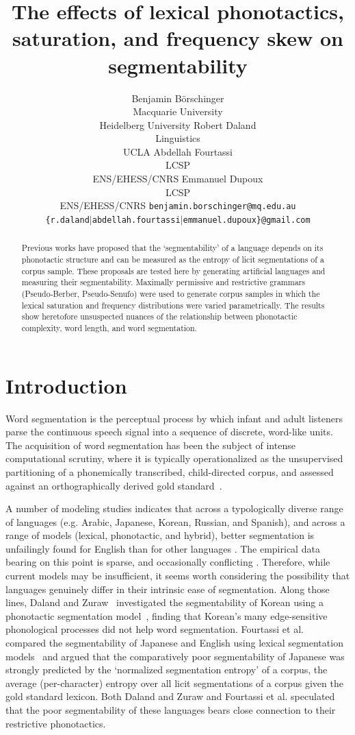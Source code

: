 \documentclass[11pt]{article}
\title{The effects of lexical phonotactics, saturation,
  and frequency skew on segmentability}
\author{Benjamin B{\"o}rschinger \\
    Macquarie University\\
    Heidelberg University \And
    Robert Daland \\
    Linguistics \\
    UCLA \And
    Abdellah Fourtassi \\
    LCSP \\
    ENS/EHESS/CNRS \And
    Emmanuel Dupoux \\
    LCSP \\
    ENS/EHESS/CNRS\AND
    {\tt benjamin.borschinger@mq.edu.au}\\
    {\tt \{r.daland$\mid$abdellah.fourtassi$\mid$emmanuel.dupoux\}@gmail.com}}
\date{}
\begin{document}
\maketitle
\begin{abstract}
  Previous works have proposed that the `segmentability' of a language
  depends on its phonotactic structure and can be measured as the
  entropy of licit segmentations of a corpus sample. These proposals
  are tested here by generating artificial languages and measuring
  their segmentability. Maximally permissive and restrictive grammars
  (Pseudo-Berber, Pseudo-Senufo) were used to generate corpus samples 
  in which the lexical saturation and frequency distributions were
  varied parametrically. The results show heretofore  unsuspected
  nuances of the relationship between phonotactic complexity, word
  length, and word segmentation.
\end{abstract}


\section{Introduction}
\vspace*{-5pt}
Word segmentation is the perceptual process by which infant and adult listeners parse the continuous speech signal into a sequence of discrete, word-like units. The acquisition of word segmentation has been the subject of intense computational scrutiny, where it is typically operationalized as the unsupervised partitioning of a phonemically transcribed, child-directed corpus, and assessed against an orthographically derived gold standard~\cite{Goldwater09a,Daland11a,Pearl10b}.

A number of modeling studies indicates that across a typologically diverse range of languages (e.g. Arabic, Japanese, Korean, Russian, and Spanish), and across a range of models (lexical, phonotactic, and hybrid), better segmentation is unfailingly found for English than for other languages \cite{Fleck08a,Daland09a,Daland11a,Fourtassi13a,Daland13a}. The empirical data bearing on this point is sparse, and occasionally conflicting \cite{Nazzi06a,Nazzi14a}. Therefore, while current models may be insufficient, it seems worth considering the possibility that languages genuinely differ in their intrinsic ease of segmentation. Along those lines, Daland and Zuraw~ investigated the segmentability of Korean using a phonotactic segmentation model~\cite{Daland11a}, finding that Korean's many edge-sensitive phonological processes did not help word segmentation. Fourtassi et al.~ compared the segmentability of Japanese and English using lexical segmentation models~\cite{Goldwater09a,Johnson09a} and argued that the comparatively poor segmentability of Japanese was strongly predicted by the `normalized segmentation entropy' of a corpus, the average (per-character) entropy over all licit segmentations of a corpus given the gold standard lexicon. Both Daland and Zuraw and Fourtassi et al. speculated that the poor segmentability of these languages bears close connection to their restrictive phonotactics.
\end{document}
